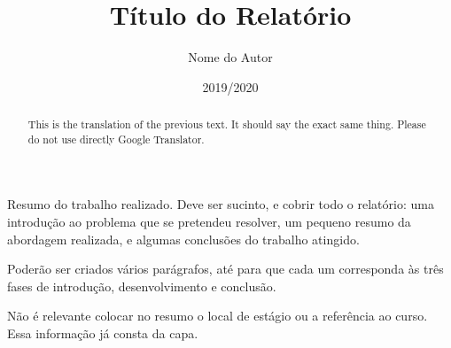 \documentclass[a4paper,12pt,twoside]{book}
\title{Título do Relatório}
\author{Nome do Autor}
\date{2019/2020}
\begin{document}
\frontmatter
\maketitle  %


\begin{resumo}
Resumo do trabalho realizado. Deve ser sucinto, e cobrir todo o relatório: uma introdução ao problema que se pretendeu resolver, um pequeno resumo da abordagem realizada, e algumas conclusões do trabalho atingido.

Poderão ser criados vários parágrafos, até para que cada um corresponda às três fases de introdução, desenvolvimento e conclusão.

Não é relevante colocar no resumo o local de estágio ou a referência ao curso. Essa informação já consta da capa.
\end{resumo}

\begin{abstract}
This is the translation of the previous text. It should say the exact same thing. Please do not use directly Google Translator.
\end{abstract}

\begin{agradecimentos}
\end{agradecimentos}


\tableofcontents

\listoffigures

\listoftables

\lstlistoflistings


\printglossary[type=\acronymtype,title={Siglas \& Acrónimos}]


\printglossary


\printglossary

 
\mainmatter








\end{document}
